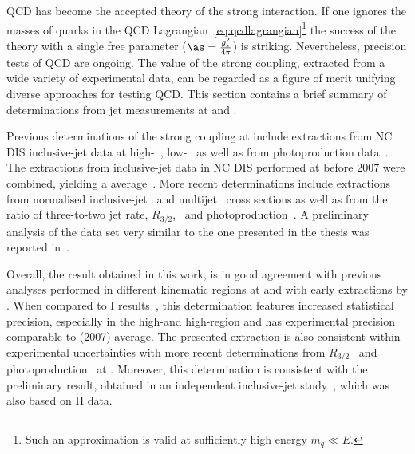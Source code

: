 QCD has become the accepted theory of the strong interaction. If one ignores the masses of quarks in the QCD Lagrangian~\eqref{eq:qcdlagrangian}\footnote{Such an approximation is valid at sufficiently high energy $m_q \ll E$.} the success of the theory with a single free parameter ($\as=\frac{g^2_s}{4\pi}$) is striking. Nevertheless, precision tests of QCD are ongoing. The value of the strong coupling, extracted from a wide variety of experimental data, can be regarded as a figure of merit unifying diverse approaches for testing QCD. This section contains a brief summary of \as determinations from jet measurements at \hera and \lhc.

Previous determinations of the strong coupling at \hera include extractions from NC DIS inclusive-jet data at high-\qsq~\cite{pl:b649:12,Aktas:2007aa}, low-\qsq~\cite{Aaron:2010ac} as well as from photoproduction data~\cite{pl:b560:7}. The extractions from inclusive-jet data in NC DIS performed at \hera before 2007 were combined, yielding a \hera average~\cite{upub:zp07125:hp07132}. More recent determinations include extractions from normalised inclusive-jet~\cite{epj:c65:363} and multijet~\cite{epj:c75:65} cross sections as well as from the ratio of three-to-two jet rate, $R_{3/2}$,~\cite{thesis:behr:2010} and photoproduction~\cite{np:b864:1}. A preliminary analysis of the data set very similar to the one presented in the thesis was reported in~\cite{upub:zp10002}.

Overall, the result obtained in this work, is in good agreement with previous analyses performed in different kinematic regions at \zeus and with early extractions by \hone. When compared to \hera I results~\cite{pl:b649:12,Aktas:2007aa,pl:b560:7}, this determination features increased statistical precision, especially in the high-\etjetb and high-\qsq region and has experimental precision comparable to \hera (2007) average. The presented extraction is also consistent within experimental uncertainties with more recent determinations from $R_{3/2}$~\cite{thesis:behr:2010} and photoproduction~\cite{np:b864:1} at \zeus. Moreover, this \asz determination is consistent with the preliminary result, obtained in an independent inclusive-jet study~\cite{upub:zp10002}, which was also based on \hera II data. %

